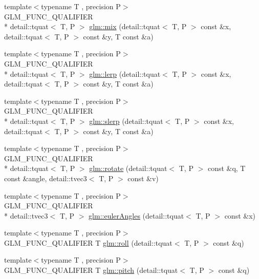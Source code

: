 \begin{DoxyCompactItemize}
\item 
{\footnotesize template$<$typename T , precision P$>$ }\\G\-L\-M\-\_\-\-F\-U\-N\-C\-\_\-\-Q\-U\-A\-L\-I\-F\-I\-E\-R \\*
detail\-::tquat$<$ T, P $>$ \hyperlink{group__gtc__quaternion_gafabf175ae3e2cd30bf58dc313321955a}{glm\-::mix} (detail\-::tquat$<$ T, P $>$ const \&x, detail\-::tquat$<$ T, P $>$ const \&y, T const \&a)
\item 
{\footnotesize template$<$typename T , precision P$>$ }\\G\-L\-M\-\_\-\-F\-U\-N\-C\-\_\-\-Q\-U\-A\-L\-I\-F\-I\-E\-R \\*
detail\-::tquat$<$ T, P $>$ \hyperlink{group__gtc__quaternion_gafc1c989eaa2c786d34218b176f680fe0}{glm\-::lerp} (detail\-::tquat$<$ T, P $>$ const \&x, detail\-::tquat$<$ T, P $>$ const \&y, T const \&a)
\item 
{\footnotesize template$<$typename T , precision P$>$ }\\G\-L\-M\-\_\-\-F\-U\-N\-C\-\_\-\-Q\-U\-A\-L\-I\-F\-I\-E\-R \\*
detail\-::tquat$<$ T, P $>$ \hyperlink{group__gtc__quaternion_ga7468a211a20ea56ea5cfb0625226868a}{glm\-::slerp} (detail\-::tquat$<$ T, P $>$ const \&x, detail\-::tquat$<$ T, P $>$ const \&y, T const \&a)
\item 
{\footnotesize template$<$typename T , precision P$>$ }\\G\-L\-M\-\_\-\-F\-U\-N\-C\-\_\-\-Q\-U\-A\-L\-I\-F\-I\-E\-R \\*
detail\-::tquat$<$ T, P $>$ \hyperlink{group__gtc__quaternion_gaa9a8891f03d8f5373525c4b3159c1c73}{glm\-::rotate} (detail\-::tquat$<$ T, P $>$ const \&q, T const \&angle, detail\-::tvec3$<$ T, P $>$ const \&v)
\item 
{\footnotesize template$<$typename T , precision P$>$ }\\G\-L\-M\-\_\-\-F\-U\-N\-C\-\_\-\-Q\-U\-A\-L\-I\-F\-I\-E\-R \\*
detail\-::tvec3$<$ T, P $>$ \hyperlink{group__gtc__quaternion_gade4034f49ccadf63cb31a7fb5fa3c8aa}{glm\-::euler\-Angles} (detail\-::tquat$<$ T, P $>$ const \&x)
\item 
{\footnotesize template$<$typename T , precision P$>$ }\\G\-L\-M\-\_\-\-F\-U\-N\-C\-\_\-\-Q\-U\-A\-L\-I\-F\-I\-E\-R T \hyperlink{group__gtc__quaternion_ga6d883e423bc425f4334fcce202131f7e}{glm\-::roll} (detail\-::tquat$<$ T, P $>$ const \&q)
\item 
{\footnotesize template$<$typename T , precision P$>$ }\\G\-L\-M\-\_\-\-F\-U\-N\-C\-\_\-\-Q\-U\-A\-L\-I\-F\-I\-E\-R T \hyperlink{group__gtc__quaternion_ga4d345dc369a54f53f5ebc375bac56d11}{glm\-::pitch} (detail\-::tquat$<$ T, P $>$ const \&q)

\end{DoxyCompactItemize}
